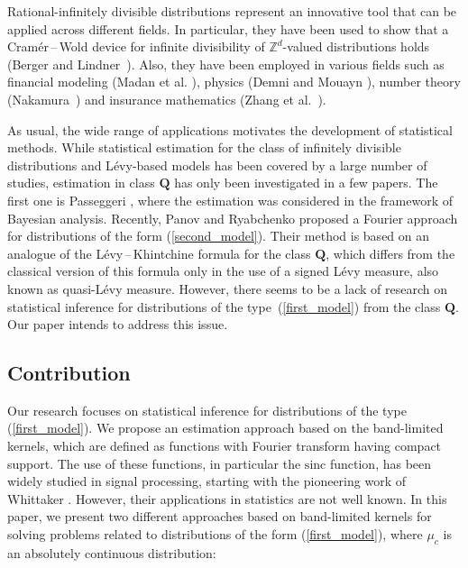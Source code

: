 \documentclass[numbers,webpdf,imaiai]{ima-authoring-template}%
\theoremstyle{thmstyletwo}%
\newcommand{\Z}{\mathbb{Z}}
\newcommand{\Q}{\pmb{Q}}
\numberwithin{equation}{section}
\begin{document}
Rational-infinitely divisible distributions represent an innovative tool that can be applied across different fields. In particular, they have been used to show that a Cram{\'e}r\,--\,Wold device for infinite divisibility of \(\Z^d\)-valued distributions holds (Berger and Lindner~\citep{BL2022}). Also, they have been employed in various fields such as financial modeling (Madan et al. \citep{Madan2023}), physics (Demni and Mouayn \citep{DM2015}), number theory (Nakamura~\citep{Nakamura2022}) and insurance mathematics (Zhang et al.~\citep{Zhang2014}). 

As usual, the wide range of applications motivates the development of  statistical methods. 
While statistical estimation for the class of infinitely divisible distributions and L{\'e}vy-based models has been covered by a large number of studies, estimation in class \(\Q\) has only been investigated in a few papers. The first one is Passeggeri \cite{Pass2023}, where the estimation was considered in the framework of Bayesian analysis. Recently, Panov and Ryabchenko \cite{PanovRyabchenko2026} proposed a Fourier  approach for distributions of the form (\ref{second_model}). Their method is based on an analogue of the L{\'e}vy\,--\,Khintchine formula for the class \(\Q\), which differs from the classical version of this formula only in the use of a signed L{\'e}vy measure, also known as quasi-L{\'e}vy measure. 
However, there seems to be a lack of research on statistical inference for distributions of the type~(\ref{first_model}) from the class \(\Q\). Our paper intends to address this issue.

\subsection{Contribution}

Our research focuses on statistical inference for  distributions of the type (\ref{first_model}).  
We propose an estimation approach based on the band-limited kernels, which are defined as functions with Fourier transform having compact support. The use of these functions, in particular the $\mathrm{sinc}$ function, has been widely studied in signal processing, starting with the pioneering work of Whittaker \cite{Whittaker1915}. However, their applications in statistics are not well known.  In this paper, we present two different approaches based on band-limited kernels for solving problems related to distributions of the form (\ref{first_model}), where  $\mu_c$ is an absolutely continuous distribution:
\end{document}
